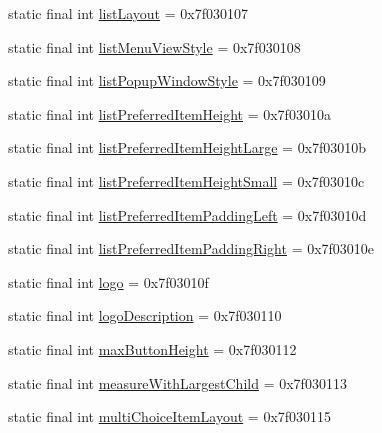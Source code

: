 \begin{DoxyCompactItemize}
\item 
static final int \mbox{\hyperlink{classcom_1_1synnapps_1_1carouselview_1_1_r_1_1attr_ad8f05942bef716af290c9f541ffdd3c5}{list\+Layout}} = 0x7f030107
\item 
static final int \mbox{\hyperlink{classcom_1_1synnapps_1_1carouselview_1_1_r_1_1attr_a8fd2975a17a78d4351039724ea28c3b2}{list\+Menu\+View\+Style}} = 0x7f030108
\item 
static final int \mbox{\hyperlink{classcom_1_1synnapps_1_1carouselview_1_1_r_1_1attr_a1035335f1189a6d9119f6a559634010a}{list\+Popup\+Window\+Style}} = 0x7f030109
\item 
static final int \mbox{\hyperlink{classcom_1_1synnapps_1_1carouselview_1_1_r_1_1attr_a3a3f9aad973ebbd024220034fd6e396a}{list\+Preferred\+Item\+Height}} = 0x7f03010a
\item 
static final int \mbox{\hyperlink{classcom_1_1synnapps_1_1carouselview_1_1_r_1_1attr_aed46ca5d6c157fbf89ecaa82227e0d3c}{list\+Preferred\+Item\+Height\+Large}} = 0x7f03010b
\item 
static final int \mbox{\hyperlink{classcom_1_1synnapps_1_1carouselview_1_1_r_1_1attr_a5704d8f5bed1f332c9f77d8a7c61b194}{list\+Preferred\+Item\+Height\+Small}} = 0x7f03010c
\item 
static final int \mbox{\hyperlink{classcom_1_1synnapps_1_1carouselview_1_1_r_1_1attr_a8d26f4d0a2c740b9c49446dcdf8aa7b7}{list\+Preferred\+Item\+Padding\+Left}} = 0x7f03010d
\item 
static final int \mbox{\hyperlink{classcom_1_1synnapps_1_1carouselview_1_1_r_1_1attr_a1870846256cdd43a4c07abba59ebe009}{list\+Preferred\+Item\+Padding\+Right}} = 0x7f03010e
\item 
static final int \mbox{\hyperlink{classcom_1_1synnapps_1_1carouselview_1_1_r_1_1attr_a9244df2408aebd11c00c85015c917813}{logo}} = 0x7f03010f
\item 
static final int \mbox{\hyperlink{classcom_1_1synnapps_1_1carouselview_1_1_r_1_1attr_ae403ffdd0a25cc0f57ef1baa5a5ba141}{logo\+Description}} = 0x7f030110
\item 
static final int \mbox{\hyperlink{classcom_1_1synnapps_1_1carouselview_1_1_r_1_1attr_a7fe1556b0a5afee7778adb6d75ddad41}{max\+Button\+Height}} = 0x7f030112
\item 
static final int \mbox{\hyperlink{classcom_1_1synnapps_1_1carouselview_1_1_r_1_1attr_a9f1dc9c4f936c3e8d2fa3a147d998bb5}{measure\+With\+Largest\+Child}} = 0x7f030113
\item 
static final int \mbox{\hyperlink{classcom_1_1synnapps_1_1carouselview_1_1_r_1_1attr_a80bd9372bea6ab25e3b11ece4887b5fc}{multi\+Choice\+Item\+Layout}} = 0x7f030115

\end{DoxyCompactItemize}
